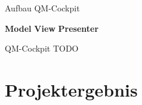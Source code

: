 \begin{frame}{Aufbau QM-Cockpit}
\begin{overlayarea}{\textwidth}{.67\textheight}
 \end{overlayarea}
 \begin{block}{\textbf<2>{Model} \textbf<3>{View} \textbf<4>{Presenter}}\end{block}
\end{frame}
\begin{frame}{QM-Cockpit}
	\huge{TODO} %
\end{frame}

\section{Projektergebnis}
